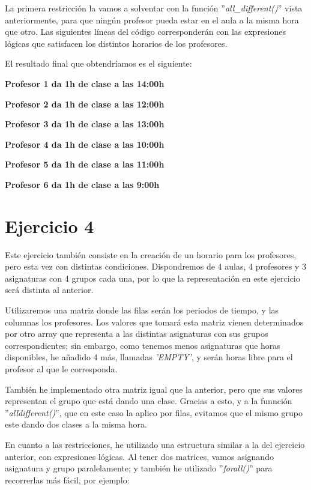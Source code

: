 \documentclass[11pt,a4paper]{article}
\begin{document}
La primera restricción la vamos a solventar con la función ''\textit{all\_different()}'' vista anteriormente, para que ningún profesor pueda estar
en el aula a la misma hora que otro. Las siguientes líneas del código corresponderán con las expresiones lógicas que satisfacen los distintos
horarios de los profesores.

El resultado final que obtendríamos es el siguiente:

    \textbf{Profesor 1 da 1h de clase a las 14:00h}

    \textbf{Profesor 2 da 1h de clase a las 12:00h}
    
    \textbf{Profesor 3 da 1h de clase a las 13:00h}
    
    \textbf{Profesor 4 da 1h de clase a las 10:00h}
    
    \textbf{Profesor 5 da 1h de clase a las 11:00h}
    
    \textbf{Profesor 6 da 1h de clase a las 9:00h}



\section*{Ejercicio 4}
Este ejercicio también consiste en la creación de un horario para los profesores, pero esta vez con distintas condiciones. Dispondremos de 4
aulas, 4 profesores y 3 asignaturas con 4 grupos cada una, por lo que la representación en este ejercicio será distinta al anterior.

Utilizaremos una matriz donde las filas serán los periodos de tiempo, y las columnas los profesores. Los valores que tomará esta matriz vienen
determinados por otro array que representa a las distintas asignaturas con sus grupos correspondientes; sin embargo, como tenemos menos
asignaturas que horas disponibles, he añadido 4 más, llamadas \textit{'EMPTY'}, y serán horas libre para el profesor al que le corresponda.

También he implementado otra matriz igual que la anterior, pero que sus valores representan el grupo que está dando una clase. Gracias a esto,
y a la funnción ''\textit{alldifferent()}'', que en este caso la aplico por filas, evitamos que el mismo grupo este dando dos clases a la misma
hora.

En cuanto a las restricciones, he utilizado una estructura similar a la del ejercicio anterior, con expresiones lógicas. Al tener dos matrices,
vamos asignando asignatura y grupo paralelamente; y también he utilizado ''\textit{forall()}'' para recorrerlas más fácil, por ejemplo:
\end{document}
